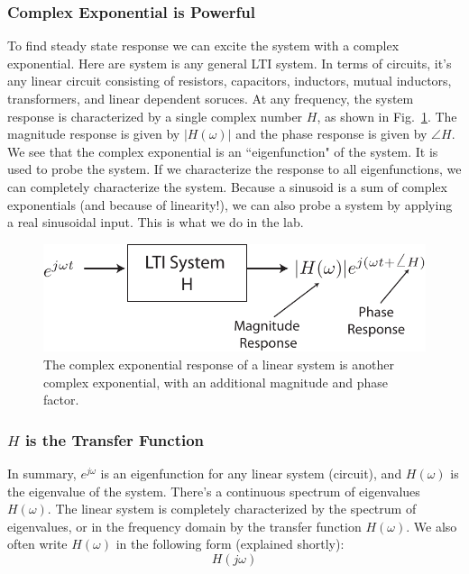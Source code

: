 \subsubsection{Complex Exponential is Powerful}
To find steady state response we can excite the system with a complex exponential.   Here are system is any general LTI system. In terms of circuits, it's any linear circuit consisting of resistors, capacitors, inductors, mutual inductors, transformers, and linear dependent soruces.  At any frequency, the system response is characterized by a single complex number $H$, as shown in Fig.~\ref{fig:lti_resp}.   The magnitude response is given by $|H(\omega)|$ and
the phase response is given by $\angle H$.   We see that the complex exponential is an ``eigenfunction" of the system.  It is used to probe the system.  If we characterize the response to all eigenfunctions, we can completely characterize the system.   Because a sinusoid is a sum of complex exponentials (and because of linearity!), we can also probe a system by applying a real sinusoidal input.  This is what we do in the lab.
\begin{figure}[tb]
\begin{center}
\includegraphics[width=.65\columnwidth]{lti_resp}
\end{center}
\caption{The complex exponential response of a linear system is another complex exponential, with an additional magnitude and phase factor. }
\label{fig:lti_resp}
\end{figure}
\subsubsection{$H$ is the Transfer Function}
In summary, $e^{j\omega}$ is an eigenfunction for any linear system (circuit), and $H(\omega)$ is the eigenvalue of the system.  There's a continuous spectrum of eigenvalues $H(\omega)$.   The linear system is completely characterized by the spectrum of eigenvalues, or in the frequency domain by the transfer function $H(\omega)$.  We also often write $H(\omega)$ in the following form (explained shortly):
    \begin{equation}
        H(j\omega)
    \end{equation}
